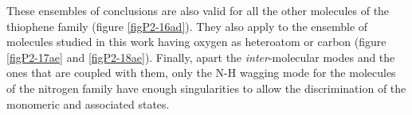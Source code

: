 	These ensembles of conclusions are also valid for all the other molecules of the thiophene family (figure \ref{figP2-16ad}). They also apply to the ensemble of molecules studied in this work having oxygen as heteroatom or carbon (figure \ref{figP2-17ae} and \ref{figP2-18ae}). Finally, apart the \textit{inter}-molecular modes and the ones that are coupled with them, only the N-H wagging mode for the molecules of the nitrogen family have enough singularities to allow the discrimination of the monomeric and associated states.
	
		
		\begin{figure}[H]
			\begin{center}
\end{center}
\end{figure}
